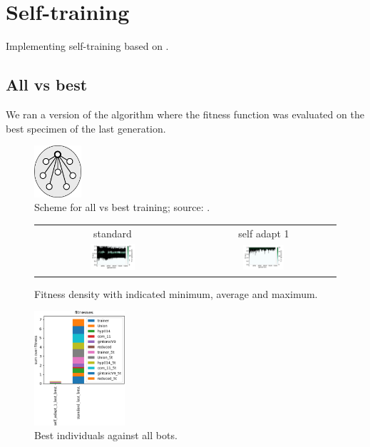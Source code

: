 \documentclass[11pt,a4paper]{scrartcl}
\begin{document}
\section{Self-training}
Implementing self-training based on \cite{Sims94evolving3d}.

\subsection{All vs best}
We ran a version of the algorithm where the fitness function was evaluated on the best specimen of the last generation.

\begin{figure}[H]
\center
\includegraphics[width=0.155555\textwidth]{img/scheme_self_training_1.png}
\caption{Scheme for all vs best training; source: \cite{Sims94evolving3d}.}
\label{fig:scheme_self_training_1}
\end{figure}

\begin{figure}[H]
\center
\begin{tabular}{cc}
standard & self adapt 1\\
\includegraphics[width=0.3\textwidth]{img/standard_last_best.png} &
\includegraphics[width=0.3\textwidth]{img/self_adapt_1_last_best.png}
\end{tabular}
\caption{Fitness density with indicated minimum, average and maximum.}
\label{fig:last_best}
\end{figure}

\begin{figure}[H]
\center
\includegraphics[width=0.3\textwidth]{img/self_training_1.png}
\caption{Best individuals against all bots.}
\label{fig:self_training_1}
\end{figure}
\end{document}
